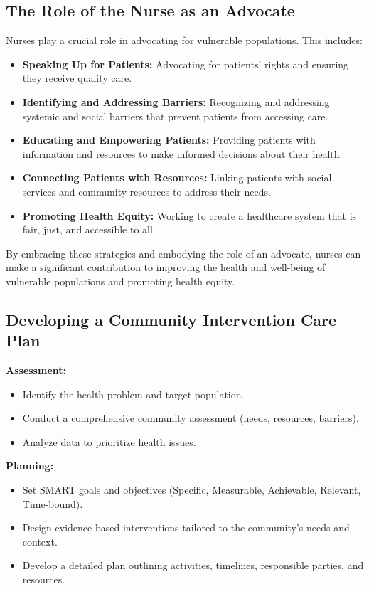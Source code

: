 \documentclass[12pt,a4paper]{article}
\begin{document}
\subsection*{The Role of the Nurse as an Advocate}
Nurses play a crucial role in advocating for vulnerable populations. This includes:
\begin{itemize}
    \item \textbf{Speaking Up for Patients:} Advocating for patients' rights and ensuring they receive quality care.
    \item \textbf{Identifying and Addressing Barriers:} Recognizing and addressing systemic and social barriers that prevent patients from accessing care.
    \item \textbf{Educating and Empowering Patients:} Providing patients with information and resources to make informed decisions about their health.
    \item \textbf{Connecting Patients with Resources:} Linking patients with social services and community resources to address their needs.
    \item \textbf{Promoting Health Equity:} Working to create a healthcare system that is fair, just, and accessible to all.
\end{itemize}

By embracing these strategies and embodying the role of an advocate, nurses can make a significant contribution to improving the health and well-being of vulnerable populations and promoting health equity.

\subsection*{Developing a Community Intervention Care Plan}

\textbf{Assessment:}
\begin{itemize}
    \item Identify the health problem and target population.
    \item Conduct a comprehensive community assessment (needs, resources, barriers).
    \item Analyze data to prioritize health issues.
\end{itemize}

\textbf{Planning:}
\begin{itemize}
    \item Set SMART goals and objectives (Specific, Measurable, Achievable, Relevant, Time-bound).
    \item Design evidence-based interventions tailored to the community's needs and context.
    \item Develop a detailed plan outlining activities, timelines, responsible parties, and resources.
\end{itemize}
\end{document}
